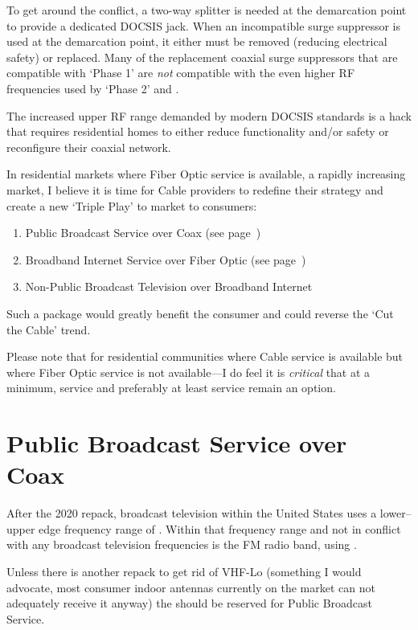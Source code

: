 To get around the \xdband{} conflict, a two-way splitter is needed at the demarcation
point to provide a dedicated DOCSIS jack. When an incompatible surge suppressor is
used at the demarcation point, it either must be removed (reducing electrical safety)
or replaced. Many of the replacement coaxial surge suppressors that are compatible
with  `Phase 1' are \emph{not} compatible with the even higher RF frequencies
used by  `Phase 2' and .

The increased upper RF range demanded by modern DOCSIS standards is a hack that requires
residential homes to either reduce functionality and/or safety or reconfigure their
coaxial network.

In residential markets where Fiber Optic service is available, a rapidly increasing
market, I believe it is time for Cable providers to redefine their strategy and
create a new `Triple Play' to market to consumers:

\begin{enumerate}
  \item Public Broadcast Service over Coax (see page~\pageref{apx:triple:broadcast})
  \item Broadband Internet Service over Fiber Optic (see page~\pageref{apx:triple:internet})
  \item Non-Public Broadcast Television over Broadband Internet
\end{enumerate}

Such a package would greatly benefit the consumer and could reverse the `Cut the Cable'
trend.

Please note that for residential communities where Cable service is available but where
Fiber Optic service is not available---I do feel it is \emph{critical} that at a minimum,
 service and preferably at least  service remain an option.

\section{Public Broadcast Service over Coax}
\label{apx:triple:broadcast}

After the 2020 repack, broadcast television within the United States uses a lower--upper edge
frequency range of \atscrange{}. Within that frequency range and not in conflict
with any broadcast television frequencies is the FM radio band, using \fmrange{}.

Unless there is another repack to get rid of VHF-Lo (something I would advocate, most consumer
indoor antennas currently on the market can not adequately receive it anyway) the
\atscrange{} should be reserved for Public Broadcast Service.

